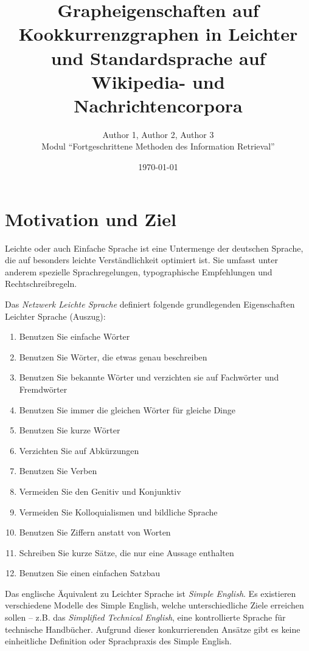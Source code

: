 \documentclass[11pt, a4paper]{article}
\title{Grapheigenschaften auf Kookkurrenzgraphen in Leichter und Standardsprache auf Wikipedia- und Nachrichtencorpora}
\author{Author 1, Author 2, Author 3\\Modul "`Fortgeschrittene Methoden des Information Retrieval"'}
\date{\today}
\begin{document}
\maketitle
\tableofcontents

\section{Motivation und Ziel}

Leichte oder auch Einfache Sprache ist eine Untermenge der deutschen Sprache,
die auf besonders leichte Verst\"andlichkeit optimiert ist. Sie umfasst unter
anderem spezielle Sprachregelungen, typographische Empfehlungen und
Rechtschreibregeln. 

Das \emph{Netzwerk Leichte Sprache} definiert folgende grundlegenden
Eigenschaften Leichter Sprache\cite{nls_regeln} (Auszug):

\begin{enumerate}
	\item Benutzen Sie einfache W\"orter
	\item Benutzen Sie W\"orter, die etwas genau beschreiben
	\item Benutzen Sie bekannte W\"orter und verzichten sie auf Fachw\"orter und Fremdw\"orter
	\item Benutzen Sie immer die gleichen W\"orter f\"ur gleiche Dinge
	\item Benutzen Sie kurze W\"orter
	\item Verzichten Sie auf Abk\"urzungen
	\item Benutzen Sie Verben
	\item Vermeiden Sie den Genitiv und Konjunktiv
	\item Vermeiden Sie Kolloquialismen und bildliche Sprache
	\item Benutzen Sie Ziffern anstatt von Worten
	\item Schreiben Sie kurze S\"atze, die nur eine Aussage enthalten
	\item Benutzen Sie einen einfachen Satzbau
\end{enumerate}

Das englische \"Aquivalent zu Leichter Sprache ist \emph{Simple English}. Es
existieren verschiedene Modelle des Simple English, welche unterschiedliche
Ziele erreichen sollen -- z.B. das \emph{Simplified Technical English}, eine
kontrollierte Sprache f\"ur technische Handb\"ucher. Aufgrund dieser
konkurrierenden Ans\"atze gibt es keine einheitliche Definition oder
Sprachpraxis des Simple English.
\end{document}
